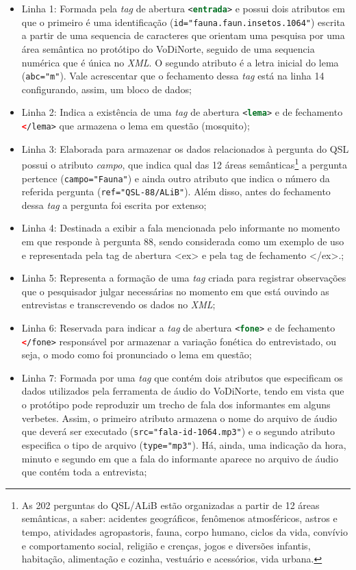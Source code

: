 \documentclass[portuguese]{textolivre}
\begin{document}
\begin{itemize}
    \item Linha 1: Formada pela \emph{tag} de abertura \lstinline[language=XML]!<entrada>! e possui dois atributos em que o primeiro é uma identificação (\lstinline[language=XML]!id="fauna.faun.insetos.1064"!) escrita a partir de uma sequencia de caracteres que orientam uma pesquisa por uma área semântica no protótipo do VoDiNorte, seguido de uma sequencia numérica que é única no \emph{XML}. O segundo atributo é a letra inicial do lema (\lstinline[language=XML]!abc="m"!). Vale acrescentar que o fechamento dessa \emph{tag} está na linha 14 configurando, assim, um bloco de dados;  
    \item Linha 2: Indica a existência de uma \emph{tag} de abertura \lstinline[language=XML]!<lema>! e  de fechamento \lstinline[language=XML]!</lema>! que armazena o lema em questão (mosquito);
    \item Linha 3: Elaborada para armazenar os dados relacionados à pergunta do QSL possui o atributo \textit{campo}, que indica qual das 12 áreas semânticas\footnote{As 202 perguntas do QSL/ALiB estão organizadas a partir de 12 áreas semânticas, a saber: acidentes geográficos, fenômenos atmosféricos, astros e tempo, atividades agropastoris, fauna, corpo humano, ciclos da vida, convívio e comportamento social, religião e crenças, jogos e diversões infantis, habitação, alimentação e cozinha, vestuário e acessórios, vida urbana.} a pergunta pertence (\lstinline[language=XML]!campo="Fauna"!) e ainda outro atributo que indica o número da referida pergunta (\lstinline[language=XML]!ref="QSL-88/ALiB"!). Além disso, antes do fechamento dessa \emph{tag} a pergunta foi escrita por extenso;
    \item Linha 4: Destinada a exibir a fala mencionada pelo informante no momento em que responde à pergunta 88, sendo considerada como um exemplo de uso e representada pela tag de abertura <ex> e pela tag de fechamento </ex>.;
    \item Linha 5: Representa a formação de uma \emph{tag} criada para registrar observações que o pesquisador julgar necessárias no momento em que está ouvindo as entrevistas e transcrevendo os dados no \emph{XML};
    \item Linha 6: Reservada para indicar a \emph{tag} de abertura \lstinline[language=XML]!<fone>! e de fechamento \lstinline[language=XML]!</fone>! responsável por armazenar a variação fonética do entrevistado, ou seja, o modo como foi pronunciado o lema em questão;
    \item Linha 7: Formada por uma \emph{tag} que contém dois atributos que especificam os dados utilizados pela ferramenta de áudio do VoDiNorte, tendo em vista que o protótipo pode reproduzir um trecho de fala dos informantes em alguns verbetes. Assim, o primeiro atributo armazena o nome do arquivo de áudio que deverá ser executado (\lstinline[language=XML]!src="fala-id-1064.mp3"!) e o segundo atributo especifica o tipo de arquivo (\lstinline[language=XML]!type="mp3"!). Há, ainda, uma indicação da hora, minuto e segundo em que a fala do informante aparece no arquivo de áudio que contém toda a entrevista;

\end{itemize}
\end{document}
